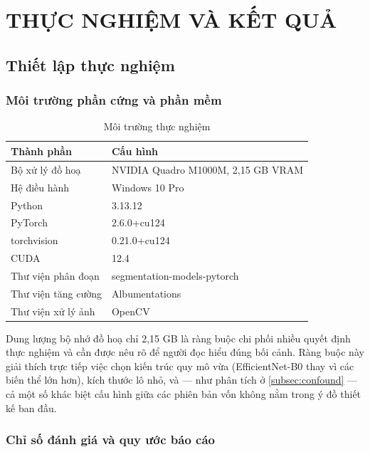 \chapter{THỰC NGHIỆM VÀ KẾT QUẢ}
\label{chap:thucnghiem}

\section{Thiết lập thực nghiệm}
\label{sec:thietlap}

\subsection{Môi trường phần cứng và phần mềm}

\begin{table}[H]
\centering
\caption{Môi trường thực nghiệm}
\label{tab:moitruong}
\begin{tabular}{L{4.4cm} L{8.6cm}}
\toprule
\textbf{Thành phần} & \textbf{Cấu hình} \\
\midrule
Bộ xử lý đồ hoạ & NVIDIA Quadro M1000M, 2,15 GB VRAM \\
Hệ điều hành    & Windows 10 Pro \\
Python          & 3.13.12 \\
PyTorch         & 2.6.0+cu124~\cite{paszke2019pytorch} \\
torchvision     & 0.21.0+cu124 \\
CUDA            & 12.4 \\
Thư viện phân đoạn & segmentation-models-pytorch~\cite{iakubovskii2019smp} \\
Thư viện tăng cường & Albumentations~\cite{buslaev2020albumentations} \\
Thư viện xử lý ảnh & OpenCV~\cite{bradski2000opencv} \\
\bottomrule
\end{tabular}
\end{table}

Dung lượng bộ nhớ đồ hoạ chỉ 2,15 GB là ràng buộc chi phối nhiều quyết định thực
nghiệm và cần được nêu rõ để người đọc hiểu đúng bối cảnh. Ràng buộc này giải
thích trực tiếp việc chọn kiến trúc quy mô vừa (EfficientNet-B0 thay vì các biến
thể lớn hơn), kích thước lô nhỏ, và --- như phân tích ở \cref{subsec:confound}
--- cả một số khác biệt cấu hình giữa các phiên bản vốn không nằm trong ý đồ
thiết kế ban đầu.

\subsection{Chỉ số đánh giá và quy ước báo cáo}

